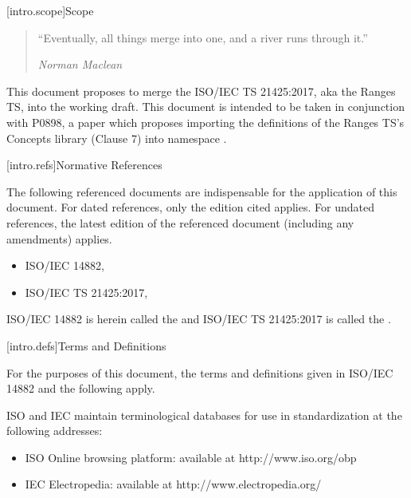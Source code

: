 [intro.scope]{Scope}

\begin{quote}
``Eventually, all things merge into one, and a river runs through it.''
\begin{flushright}
\textemdash \textit{Norman Maclean}
\end{flushright}
\end{quote}

\pnum
This document proposes to merge the ISO/IEC TS 21425:2017, aka the Ranges TS,
into the working draft. This document is intended to be taken in conjunction with
P0898, a paper which proposes importing the definitions of the Ranges TS's Concepts
library (Clause 7) into namespace .

[intro.refs]{Normative References}

\pnum
The following referenced documents are indispensable for the
application of this document. For dated references, only the
edition cited applies. For undated references, the latest edition
of the referenced document (including any amendments) applies.

\begin{itemize}
\item ISO/IEC 14882, 
\item ISO/IEC TS 21425:2017, 
\end{itemize}

ISO/IEC 14882 is herein called the \defn{C\Rplus\Rplus\xspace Standard} and
ISO/IEC TS 21425:2017 is called the .

[intro.defs]{Terms and Definitions}


For the purposes of this document, the terms and definitions given in
ISO/IEC 14882 and the following apply.

ISO and IEC maintain terminological databases for use in standardization at
the following addresses:
\begin{itemize}
\item
ISO Online browsing platform: available at http://www.iso.org/obp
\item
IEC Electropedia: available at http://www.electropedia.org/
\end{itemize}

\def\definition{\definitionx{\section}}%


